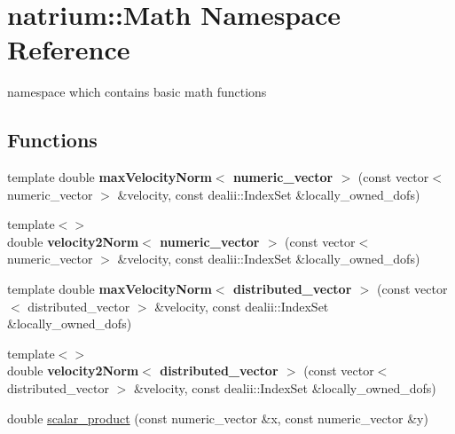 \hypertarget{namespacenatrium_1_1Math}{
\section{natrium::Math Namespace Reference}
\label{namespacenatrium_1_1Math}
}


namespace which contains basic math functions  
\subsection*{Functions}
\begin{DoxyCompactItemize}
\item 
\hypertarget{namespacenatrium_1_1Math_a679e2186fce3ecd63b28f12abe85d6c8}{
template double {\bfseries maxVelocityNorm$<$ numeric\_\-vector $>$} (const vector$<$ numeric\_\-vector $>$ \&velocity, const dealii::IndexSet \&locally\_\-owned\_\-dofs)}
\label{namespacenatrium_1_1Math_a679e2186fce3ecd63b28f12abe85d6c8}

\item 
\hypertarget{namespacenatrium_1_1Math_a2e30b25874b35438b936980fded05cea}{
{\footnotesize template$<$$>$ }\\double {\bfseries velocity2Norm$<$ numeric\_\-vector $>$} (const vector$<$ numeric\_\-vector $>$ \&velocity, const dealii::IndexSet \&locally\_\-owned\_\-dofs)}
\label{namespacenatrium_1_1Math_a2e30b25874b35438b936980fded05cea}

\item 
\hypertarget{namespacenatrium_1_1Math_a5d090f1b2fa0e48d746ec70877178a8f}{
template double {\bfseries maxVelocityNorm$<$ distributed\_\-vector $>$} (const vector$<$ distributed\_\-vector $>$ \&velocity, const dealii::IndexSet \&locally\_\-owned\_\-dofs)}
\label{namespacenatrium_1_1Math_a5d090f1b2fa0e48d746ec70877178a8f}

\item 
\hypertarget{namespacenatrium_1_1Math_a2e8a1b8caedd5cd6c1140bdc1f4cf2d5}{
{\footnotesize template$<$$>$ }\\double {\bfseries velocity2Norm$<$ distributed\_\-vector $>$} (const vector$<$ distributed\_\-vector $>$ \&velocity, const dealii::IndexSet \&locally\_\-owned\_\-dofs)}
\label{namespacenatrium_1_1Math_a2e8a1b8caedd5cd6c1140bdc1f4cf2d5}

\item 
\hypertarget{namespacenatrium_1_1Math_a60a79394533003516ee1895b0cb93c73}{
double \hyperlink{namespacenatrium_1_1Math_a60a79394533003516ee1895b0cb93c73}{scalar\_\-product} (const numeric\_\-vector \&x, const numeric\_\-vector \&y)}
\label{namespacenatrium_1_1Math_a60a79394533003516ee1895b0cb93c73}


\end{DoxyCompactItemize}
